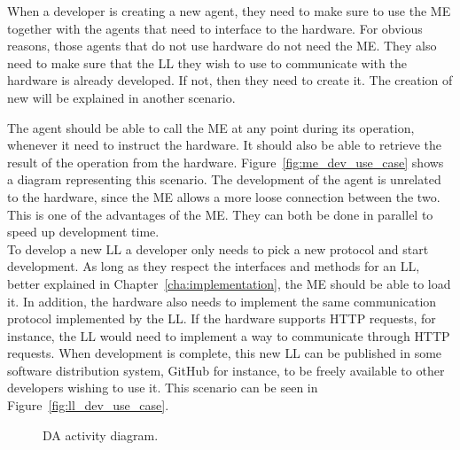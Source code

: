 When a developer is creating a new agent, they need to make sure to use the \acrlong{ME} together with the agents that need to interface to the hardware. For obvious reasons, those agents that do not use hardware do not need the \acrshort{ME}. They also need to make sure that the \acrshort{LL} they wish to use to communicate with the hardware is already developed. If not, then they need to create it. The creation of new  will be explained in another scenario. 

The agent should be able to call the \acrshort{ME} at any point during its operation, whenever it need to instruct the hardware. It should also be able to retrieve the result of the operation from the hardware. Figure~\ref{fig:me_dev_use_case} shows a diagram representing this scenario. The development of the agent is unrelated to the hardware, since the \acrshort{ME} allows a more loose connection between the two. This is one of the advantages of the \acrlong{ME}. They can both be done in parallel to speed up development time.\\

To develop a new \acrlong{LL} a developer only needs to pick a new protocol and start development. As long as they respect the interfaces and methods for an \acrshort{LL}, better explained in Chapter~\ref{cha:implementation}, the \acrshort{ME} should be able to load it. In addition, the hardware also needs to implement the same communication protocol implemented by the \acrshort{LL}. If the hardware supports \acrshort{HTTP} requests, for instance, the \acrshort{LL} would need to implement a way to communicate through \acrshort{HTTP} requests. When development is complete, this new \acrshort{LL} can be published in some software distribution system, GitHub for instance, to be freely available to other developers wishing to use it. This scenario can be seen in Figure~\ref{fig:ll_dev_use_case}.

\begin{figure}[H]
	\centering
	\hspace{0.50cm}
	\caption{\acrlong{DA} activity diagram.}
	\label{fig:dev_use_case}
\end{figure}


